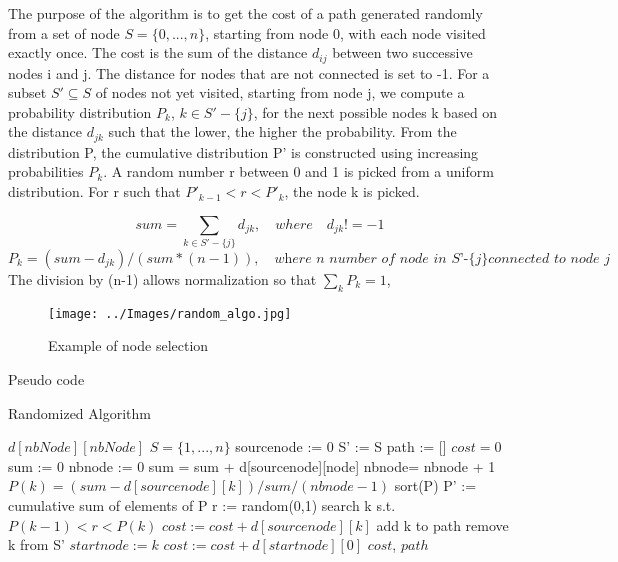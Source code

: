 \documentclass[../report.tex]{subfiles}
\begin{document}
The purpose of the algorithm is to get the cost of a path generated randomly from a set of node $S=\{0,...,n\}$, starting from node 0, with each node visited exactly once. The cost is the sum of the distance $d_{ij}$ between two successive nodes i and j. The distance for nodes that are not connected is set to -1.
\newline{} 
For a subset $S'\subseteq S$ of nodes not yet visited, starting from node j, we compute a probability distribution $P_{k}$, $k \in S'-\{j\}$, for the next possible nodes k based on the distance $d_{jk}$ such that the lower, the higher the probability. From the distribution P, the cumulative distribution P' is constructed using increasing probabilities $P_{k}$.  A random number r between 0 and 1 is picked from a uniform distribution. For r such that $P'_{k-1}< r <P'_{k}$, the node k is picked.


\[ sum = \sum_{k \in S'-\{j\}} d_{jk}, \quad {where} \quad d_{jk}!=-1 \]   
\[ P_{k} = (sum - d_{jk})/(sum*(n-1)), \quad \textit{where n number of node in S'-\{j\} connected to node j}\]
The division by (n-1) allows normalization so that $\sum_{k} P_{k}=1$,

\begin{figure}[ht]
\centering
\texttt{[image: ../Images/random\_algo.jpg]}
\caption{Example of node selection \label{overflow}}
\end{figure}

\begin{subsection}{Pseudo code}\hfill

\begin{center}
	\colorbox[gray]{0.95}{
	\begin{minipage}{0.85\textwidth}
\begin{algorithm}[H]
\caption{Randomized Algorithm}
\begin{algorithmic} 
\REQUIRE{  }
   \STATE $d[nbNode][nbNode]$
   \STATE $S=\{1,...,n\}$
\ENSURE {}
\STATE sourcenode := 0
\STATE S' := S
\STATE path := []
\STATE $cost = 0$
   \STATE sum := 0
   \STATE nbnode := 0
      \STATE sum = sum + d[sourcenode][node]
      \STATE nbnode= nbnode + 1
   \ENDFOR   
      \STATE $P(k) = (sum - d[sourcenode][k])/sum/(nbnode-1)$
   \ENDFOR
   \STATE sort(P)
   \STATE P' := cumulative sum of elements of P
   \STATE r := random(0,1)
   \STATE search k s.t. $P(k-1)<r<P(k)$
   \STATE $cost := cost + d[sourcenode][k]$
   \STATE add k to path
   \STATE remove k from S'
   \STATE $startnode := k$   
\ENDWHILE
\STATE $cost := cost + d[startnode][0]$
\RETURN $cost$, $path$
\end{algorithmic}
\end{algorithm}
\end{minipage}}
\end{center}
\end{subsection}
\end{document}
